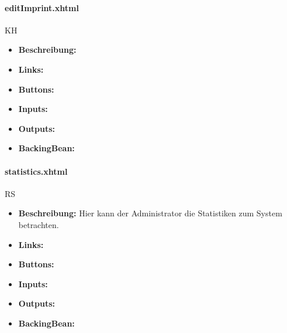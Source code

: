 				\paragraph{editImprint.xhtml}
					KH\\
					\begin{itemize}
						\item \textbf{Beschreibung:}
						\item \textbf{Links:}
						\item \textbf{Buttons:}
						\item \textbf{Inputs:}
						\item \textbf{Outputs:}
						\item \textbf{BackingBean:}
					\end{itemize}
				
				\paragraph{statistics.xhtml}
					RS\\
					\begin{itemize}
						\item \textbf{Beschreibung:} Hier kann der Administrator die Statistiken zum System betrachten.
						\item \textbf{Links:}
						\item \textbf{Buttons:}
						\item \textbf{Inputs:}
						\item \textbf{Outputs:}
						\item \textbf{BackingBean:}
					\end{itemize}